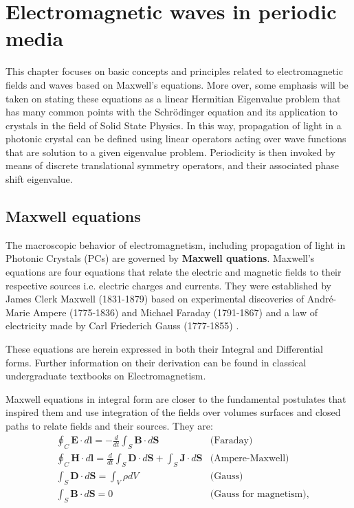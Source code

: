 \chapter{Electromagnetic waves in periodic media}
\label{ch:Electromagnetic waves in periodic media}

This chapter focuses on basic concepts and principles related to electromagnetic fields and waves based on Maxwell's equations. More over, some emphasis will be taken on stating these equations as a linear Hermitian Eigenvalue problem that has many common points with the Schrödinger equation and its application to crystals in the field of Solid State Physics.
In this way, propagation of light in a photonic crystal can be defined using linear operators acting over wave functions that are solution to a given eigenvalue problem.  Periodicity is then invoked by means of discrete translational symmetry operators, and their associated phase shift eigenvalue. 

\section{Maxwell equations}

The macroscopic behavior of electromagnetism, including propagation of light in Photonic Crystals (PCs) are governed by \textbf{Maxwell quations}. Maxwell's equations are four equations that relate the electric and magnetic fields to their respective sources i.e. electric charges and currents. They were established by James Clerk Maxwell (1831-1879) based on experimental discoveries of André-Marie Ampere (1775-1836) and Michael Faraday (1791-1867) and a law of electricity made by Carl Friederich Gauss (1777-1855) \cite{Jin2010}.

These equations are herein expressed in both their Integral and Differential forms. Further information on their derivation can be found in classical undergraduate textbooks on Electromagnetism. 

Maxwell equations in integral form are closer to the fundamental postulates that inspired them and use integration of the fields over volumes surfaces and closed paths to relate fields and their sources. They are: 
\begin{align}
&\oint_C \mathbf{E}\cdot d\mathbf{l} = -\frac{d}{dt}\int_S \mathbf{B}\cdot d\mathbf{S} &\mbox{(Faraday)}\\
&\oint_C \mathbf{H}\cdot d\mathbf{l} = \frac{d}{dt}\int_S \mathbf{D}\cdot d\mathbf{S} + \int_S \mathbf{J}\cdot d\mathbf{S} &\mbox{(Ampere-Maxwell)}\\
&\int_S \mathbf{D}\cdot d\mathbf{S} = \int_V \rho dV &\mbox{(Gauss)} \label{eq:Gauss}\\
&\int_S \mathbf{B}\cdot d\mathbf{S} = 0 &\mbox{(Gauss for magnetism)},
\end{align}

